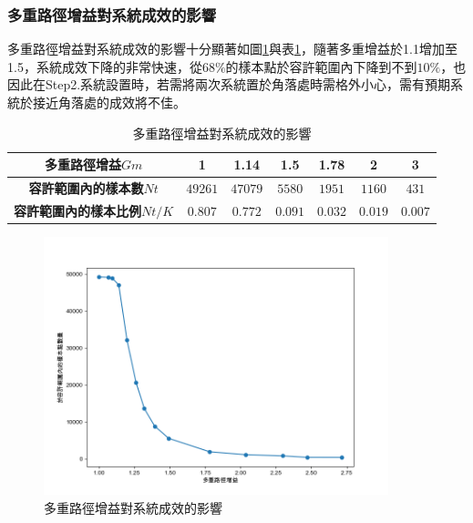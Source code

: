     \subsubsection{多重路徑增益對系統成效的影響}
    \label{chp:multipath_bandwidth}

    多重路徑增益對系統成效的影響十分顯著如圖\ref{pic:multipath_effect}與表\ref{tab:multipath_effect}，隨著多重增益於1.1增加至1.5，系統成效下降的非常快速，從$68\%$的樣本點於容許範圍內下降到不到$10\%$，也因此在Step2.系統設置時，若需將兩次系統置於角落處時需格外小心，需有預期系統於接近角落處的成效將不佳。



    \begin{table}[htpb]
        \begin{center}
          \caption{多重路徑增益對系統成效的影響}
          \label{tab:multipath_effect}
          \begin{tabular}{|c||c|c|c|c|c|c|} %
            \hline  
           \textbf{多重路徑增益$Gm$} &
           1&
           1.14&
           1.5&
           1.78&
           2&
           3
           \\\hline\hline

           \textbf{容許範圍內的樣本數$Nt$} &
           $49261$&
           $47079$&
           $5580$&
           $1951$&
           $1160$&
           $431$
           \\\hline

           \textbf{容許範圍內的樣本比例$Nt/K$} &
           $0.807$&
           $0.772$&
           $0.091$&
           $0.032$&
           $0.019$&
           $0.007$
           \\\hline
         \end{tabular}
       \end{center}
     \end{table}

     \begin{figure}[htpb]
        \centering
        \includegraphics[width=10cm]{ch4pic/multipath_effect.png}
        \caption{多重路徑增益對系統成效的影響}
        \label{pic:multipath_effect}
    \end{figure}



